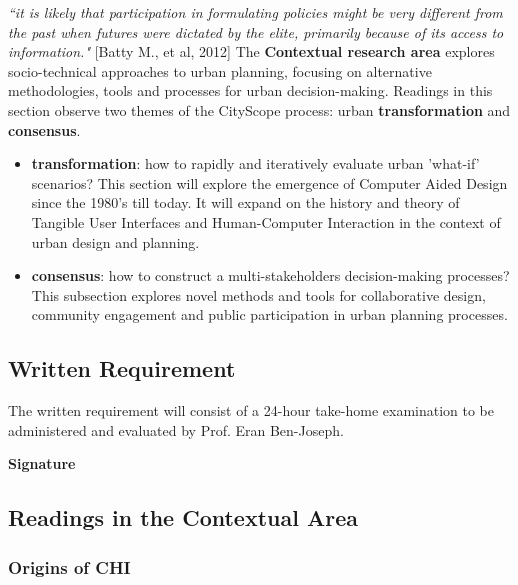 \textit{``it is likely that participation in formulating policies might be very different from the past when futures were dictated by the elite, primarily because of its access to information."} [Batty M., et al, 2012]
\newline
The \textbf{Contextual research area} explores socio-technical approaches to urban planning, focusing on alternative methodologies, tools and processes for urban decision-making. Readings in this section observe two themes of the CityScope process: urban \textbf{transformation} and \textbf{consensus}.
\begin{itemize}
\item \textbf{transformation}: how to rapidly and iteratively evaluate urban 'what-if' scenarios? This section will explore the emergence of Computer Aided Design since the 1980's till today. It will expand on the history and theory of Tangible User Interfaces and Human-Computer Interaction in the context of urban design and planning. 
\item \textbf{consensus}: how to construct a multi-stakeholders decision-making processes?
This subsection explores novel methods and tools for collaborative design, community engagement and public participation in urban planning processes.  

\end{itemize}
% 
\subsection*{Written Requirement}
The written requirement will consist of a 24-hour take-home examination to be administered and evaluated
by Prof. Eran Ben-Joseph.\par
% 
\textbf{Signature}\hspace{0.5cm} \makebox[2in]{\hrulefill}

\newpage
\subsection*{Readings in the Contextual Area}
\subsubsection*{Origins of CHI}
\begin{bibunit}[unsrt]
\nocite{*}
\end{bibunit}
